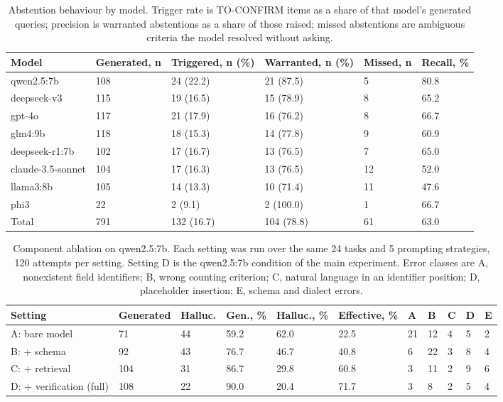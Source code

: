 \documentclass[10pt]{article}
\begin{document}
\begin{table}[!ht]
\caption{Abstention behaviour by model. Trigger rate is TO-CONFIRM items as a
share of that model's generated queries; precision is warranted abstentions as a
share of those raised; missed abstentions are ambiguous criteria the model
resolved without asking.}
\label{tab:abstain}
\centering
\footnotesize
\setlength{\tabcolsep}{5pt}
\begin{tabular*}{\linewidth}{@{\extracolsep{\fill}}llllll@{}}
\toprule
Model & Generated, n & Triggered, n (\%) & Warranted, n (\%) & Missed, n & Recall, \%\\
\midrule
qwen2.5:7b        & 108 & 24 (22.2) & 21 (87.5) & 5  & 80.8\\
deepseek-v3       & 115 & 19 (16.5) & 15 (78.9) & 8  & 65.2\\
gpt-4o            & 117 & 21 (17.9) & 16 (76.2) & 8  & 66.7\\
glm4:9b           & 118 & 18 (15.3) & 14 (77.8) & 9  & 60.9\\
deepseek-r1:7b    & 102 & 17 (16.7) & 13 (76.5) & 7  & 65.0\\
claude-3.5-sonnet & 104 & 17 (16.3) & 13 (76.5) & 12 & 52.0\\
llama3:8b         & 105 & 14 (13.3) & 10 (71.4) & 11 & 47.6\\
phi3              & 22  & 2 (9.1)   & 2 (100.0) & 1  & 66.7\\
\midrule
Total             & 791 & 132 (16.7) & 104 (78.8) & 61 & 63.0\\
\bottomrule
\end{tabular*}
\end{table}

\begin{table}[!ht]
\caption{Component ablation on qwen2.5:7b. Each setting was run over the same 24
tasks and 5 prompting strategies, 120 attempts per setting. Setting D is the
qwen2.5:7b condition of the main experiment. Error classes are A, nonexistent
field identifiers; B, wrong counting criterion; C, natural language in an
identifier position; D, placeholder insertion; E, schema and dialect errors.}
\label{tab:ablation}
\centering
\footnotesize
\setlength{\tabcolsep}{4pt}
\begin{tabular*}{\linewidth}{@{\extracolsep{\fill}}lllllllllll@{}}
\toprule
Setting & Generated & Halluc. & Gen., \% & Halluc., \% & Effective, \% & A & B & C & D & E\\
\midrule
A: bare model            & 71  & 44 & 59.2 & 62.0 & 22.5 & 21 & 12 & 4 & 5 & 2\\
B: + schema              & 92  & 43 & 76.7 & 46.7 & 40.8 & 6  & 22 & 3 & 8 & 4\\
C: + retrieval           & 104 & 31 & 86.7 & 29.8 & 60.8 & 3  & 11 & 2 & 9 & 6\\
D: + verification (full) & 108 & 22 & 90.0 & 20.4 & 71.7 & 3  & 8  & 2 & 5 & 4\\
\bottomrule
\end{tabular*}
\end{table}
\end{document}
